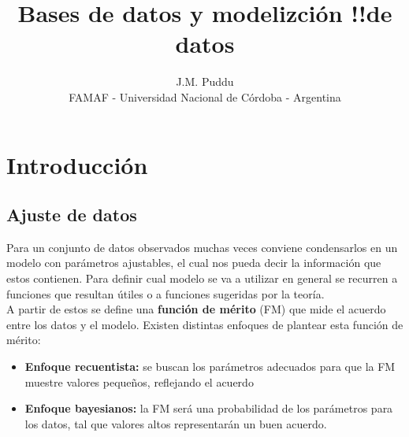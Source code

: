 \documentclass[twocolumn]{article}
\title{Bases de datos y modelizción !!de datos}
\author{J.M. Puddu \\ FAMAF - Universidad Nacional de Córdoba - Argentina}
\begin{document}

\section{Introducción}




\citet{libroimportante}

\subsection{Ajuste de datos}
Para un conjunto de datos observados muchas veces conviene condensarlos en un modelo con parámetros ajustables, el cual nos pueda decir la información que estos contienen.
Para definir cual modelo se va a utilizar en general se recurren a funciones que resultan útiles o a funciones sugeridas por la teoría.
\\
A partir de estos se define una \textbf{función de mérito} (FM) que mide 
el acuerdo entre los datos y el modelo. Existen distintas enfoques de plantear esta función de mérito: 
\begin{itemize}
\item \textbf{Enfoque recuentista:} se buscan los parámetros adecuados para que la FM muestre valores pequeños, reflejando el acuerdo
\item \textbf{Enfoque bayesianos:} la FM será una probabilidad de los parámetros para los datos, tal que valores altos representarán un buen acuerdo.
\end{itemize} 
\end{document}
